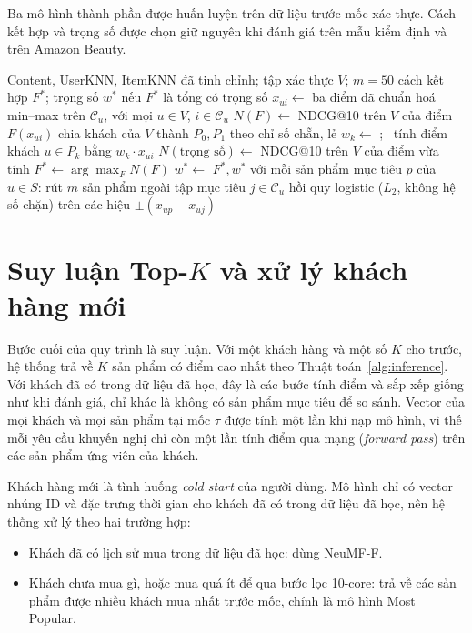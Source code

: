Ba mô hình thành phần được huấn luyện trên dữ liệu trước mốc xác thực. Cách kết hợp và trọng số được chọn giữ nguyên khi đánh giá trên mẫu kiểm định và trên Amazon Beauty.

\begin{algorithm}[H]
\caption{Chọn cách kết hợp của Hybrid-CBCF}
\label{alg:hybrid}
\begin{algorithmic}[1]
\Require Content, UserKNN, ItemKNN đã tinh chỉnh; tập xác thực $V$; $m = 50$
\Ensure cách kết hợp $F^*$; trọng số $w^*$ nếu $F^*$ là tổng có trọng số
\State $x_{ui} \gets$ ba điểm đã chuẩn hoá min--max trên $\mathcal{C}_u$, với mọi $u \in V$, $i \in \mathcal{C}_u$
 
    \State $N(F) \gets$ NDCG@10 trên $V$ của điểm $F(x_{ui})$
\EndFor
\State chia khách của $V$ thành $P_0, P_1$ theo chỉ số chẵn, lẻ 
    \State $w_k \gets$ ; \ tính điểm khách $u \in P_k$ bằng $w_k \cdot x_{ui}$
\EndFor
\State $N(\text{trọng số}) \gets$ NDCG@10 trên $V$ của điểm vừa tính
\State $F^* \gets \arg\max_F N(F)$
    \State $w^* \gets$ 
\EndIf
\State \Return $F^*, w^*$
\Statex
{}
    \State với mỗi sản phẩm mục tiêu $p$ của $u \in S$: rút $m$ sản phẩm ngoài tập mục tiêu $j \in \mathcal{C}_u$
    \State \Return hồi quy logistic ($L_2$, không hệ số chặn) trên các hiệu $\pm(x_{up} - x_{uj})$
\EndFunction
\end{algorithmic}
\end{algorithm}

\section{Suy luận Top-\texorpdfstring{$K$}{K} và xử lý khách hàng mới}
\label{sec:inference}

Bước cuối của quy trình là suy luận. Với một khách hàng và một số $K$ cho trước, hệ thống trả về $K$ sản phẩm có điểm cao nhất theo Thuật toán~\ref{alg:inference}. Với khách đã có trong dữ liệu đã học, đây là các bước tính điểm và sắp xếp giống như khi đánh giá, chỉ khác là không có sản phẩm mục tiêu để so sánh. Vector của mọi khách và mọi sản phẩm tại mốc $\tau$ được tính một lần khi nạp mô hình, vì thế mỗi yêu cầu khuyến nghị chỉ còn một lần tính điểm qua mạng (\textit{forward pass}) trên các sản phẩm ứng viên của khách.

Khách hàng mới là tình huống \textit{cold start} của người dùng. Mô hình chỉ có vector nhúng ID và đặc trưng thời gian cho khách đã có trong dữ liệu đã học, nên hệ thống xử lý theo hai trường hợp:
\begin{itemize}
    \item Khách đã có lịch sử mua trong dữ liệu đã học: dùng NeuMF-F.
    \item Khách chưa mua gì, hoặc mua quá ít để qua bước lọc 10-core: trả về các sản phẩm được nhiều khách mua nhất trước mốc, chính là mô hình Most Popular.
\end{itemize}

